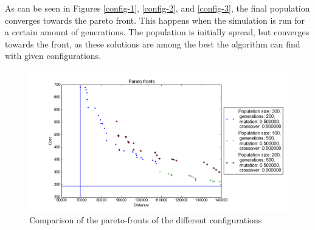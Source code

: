 \documentclass[
]{article}
\begin{document}
As can be seen in Figures \ref{config-1}, \ref{config-2}, and \ref{config-3}, the final population converges towards the pareto front. This happens when the simulation is run for a certain amount of generations. The population is initially spread, but converges towards the front, as these solutions are among the best the algorithm can find with given configurations.

\begin{figure}[H]
    \centering
    \includegraphics[scale=0.5]{all-configs-pareto.png}
    \caption{Comparison of the pareto-fronts of the different configurations}
\end{figure}

\end{document}

